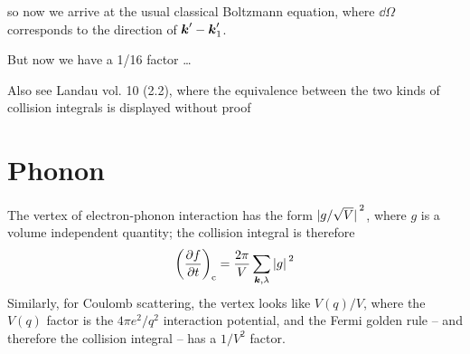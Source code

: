 \documentclass[hyperref, a4paper]{article}
\begin{document}
so now we arrive at the usual classical Boltzmann equation, 
where $\dd{\Omega}$ corresponds to the direction of $\vb*{k}' - \vb*{k}'_1$.

But now we have a 1/16 factor \dots

Also see Landau vol. 10 (2.2), 
where the equivalence between the two kinds of collision integrals 
is displayed without proof

\section{Phonon}

The vertex of electron-phonon interaction has the form $\abs*{g / \sqrt{V}}^2$,
where $g$ is a volume independent quantity;
the collision integral is therefore 
\begin{equation}
    \left(\pdv{f}{t}\right)_{\text{c}} = 
    \frac{2\pi}{V} \sum_{\vb*{k}, \lambda} \abs*{g}^2 
\end{equation}
Similarly, for Coulomb scattering, 
the vertex looks like $V(q) / V$, where the $V(q)$ factor 
is the $4 \pi e^2 / q^2$ interaction potential, 
and the Fermi golden rule -- and therefore the collision integral -- 
has a $1/ V^2$ factor.

\printbibliography
\end{document}
